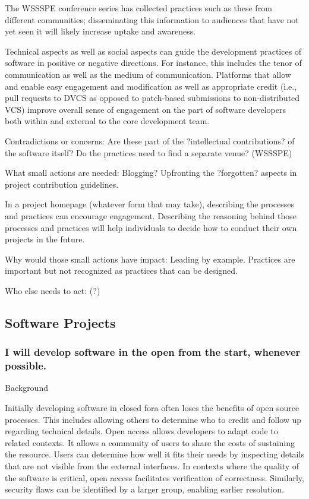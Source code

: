 \documentclass[a4paper,UKenglish]{dagman}
\renewcommand{\paragraph}[1]{\subsubsection*{#1}\xspace}
\begin{document}
The WSSSPE conference series has collected practices such as these from different communities; disseminating this information to audiences that have not yet seen it will likely increase uptake and awareness.

Technical aspects as well as social aspects can guide the development practices of software in positive or negative directions.  For instance, this includes the tenor of communication as well as the medium of communication.  Platforms that allow and enable easy engagement and modification as well as appropriate credit (i.e., pull requests to DVCS as opposed to patch-based submissions to non-distributed VCS) improve overall sense of engagement on the part of software developers both within and external to the core development team.

Contradictions or concerns: Are these part of the ?intellectual contributions? of the software itself?  Do the practices need to find a separate venue?  (WSSSPE)

What small actions are needed: Blogging? Upfronting the ?forgotten? aspects in project contribution guidelines.

In a project homepage (whatever form that may take), describing the processes and practices can encourage engagement.  Describing the reasoning behind those processes and practices will help individuals to decide how to conduct their own projects in the future.  

Why would those small actions have impact: Leading by example. Practices are important but not recognized as practices that can be designed.

Who else needs to act: (?)


\subsection{Software Projects}

\paragraph{I will develop software in the open from the start, whenever possible.}

Background

Initially developing software in closed fora often loses the benefits of open source processes. This includes allowing others to determine who to credit and follow up regarding technical details. Open access allows developers to adapt code to related contexts. It allows a community of users to share the costs of sustaining the resource. Users can determine how well it fits their needs by inspecting details that are not visible from the external interfaces. In contexts where the quality of the software is critical, open access facilitates verification of correctness. Similarly, security flaws can be identified by a larger group, enabling earlier resolution.
 
\end{document}

